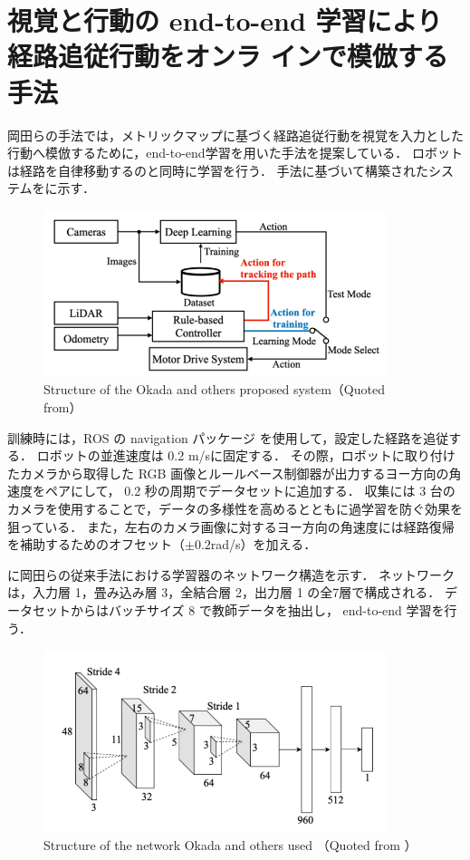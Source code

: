 \section{視覚と行動の end-to-end 学習により経路追従行動をオンラ
インで模倣する手法}
岡田らの手法では，メトリックマップに基づく経路追従行動を視覚を入力とした行動へ模倣するために，end-to-end学習を用いた手法を提案している．
ロボットは経路を自律移動するのと同時に学習を行う．
手法に基づいて構築されたシステムをに示す．

\begin{figure}[htbp]
  \centering
   \includegraphics[width=100mm]{images/pdf/okada/method_sys.pdf}
   \caption[Structure of the Okada and others proposed system]{Structure of the Okada and others proposed system（Quoted from\cite{okada2020}）}
   \label{fig:okada_sys}
\end{figure}

訓練時には，ROS の navigation パッケージ \cite{ros}を使用して，設定した経路を追従する．
ロボットの並進速度は 0.2 m/sに固定する．
その際，ロボットに取り付けたカメラから取得した RGB 画像とルールベース制御器が出力するヨー方向の角速度をペアにして， 0.2 秒の周期でデータセットに追加する．
収集には 3 台のカメラを使用することで，データの多様性を高めるとともに過学習を防ぐ効果を狙っている．
また，左右のカメラ画像に対するヨー方向の角速度には経路復帰を補助するためのオフセット（\(\pm 0.2\)rad/s）を加える．

\newpage
{}に岡田らの従来手法における学習器のネットワーク構造を示す．
ネットワークは，入力層 1，畳み込み層 3，全結合層 2，出力層 1 の全7層で構成される．
データセットからはバッチサイズ 8 で教師データを抽出し， end-to-end 学習を行う．

\begin{figure}[htbp]
    \centering
     \includegraphics[width=100mm]{images/pdf/okada/network.pdf}
     \caption[Structure of the network Okada and others used]{Structure of the network Okada and others used （Quoted from \cite{okada2020}）}
     \label{fig:okada_net}
\end{figure}

